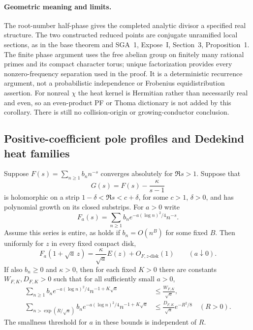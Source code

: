 \paragraph{Geometric meaning and limits.}
The root-number half-phase gives the completed analytic divisor a
specified real structure. The two constructed reduced points are
conjugate unramified local sections, as in the base theorem and
SGA~1, Expose~I, Section~3, Proposition~1. The finite phase argument
uses the free abelian group on finitely many rational primes and
its compact character torus; unique factorization provides every
nonzero-frequency separation used in the proof. It is a
deterministic recurrence argument, not a probabilistic independence
or Frobenius equidistribution assertion. For nonreal \(\chi\) the
heat kernel is Hermitian rather than necessarily real and even,
so an even-product PF or Thoma dictionary is not added by this
corollary. There is still no collision-origin or growing-conductor
conclusion.


\subsection{Positive-coefficient pole profiles and Dedekind heat families}

\begin{lemma}
\label{lem:A051-generalpole}
Suppose \(F(s)=\sum_{n\ge1}b_nn^{-s}\) converges absolutely for
\(\Re s>1\). Suppose that
\[
                  G(s)=F(s)-\frac\kappa{s-1}
\]
is holomorphic on a strip \(1-\delta<\Re s<c+\delta\), for some
\(c>1\), \(\delta>0\), and has polynomial growth on its closed
substrips. For \(a>0\) write
\[
                  F_a(s)=\sum_{n\ge1}
                      b_ne^{-a(\log n)^2/4}n^{-s}.
\]
Assume this series is entire, as holds if \(b_n=O(n^B)\) for some
fixed \(B\). Then uniformly for \(z\) in every fixed compact disk,
\begin{equation}\label{eq:A051-generalpole}
           F_a(1+\sqrt a\,z)
                =\frac\kappa{\sqrt a}E(z)+O_{F,z\text{-disk}}(1)
                           \qquad(a\downarrow0).
\end{equation}
If also \(b_n\ge0\) and \(\kappa>0\), then for each fixed \(K>0\)
there are constants \(W_{F,K},D_{F,K}>0\) such that for all
sufficiently small \(a>0\),
\begin{align}
 \sum_{n\ge1}b_ne^{-a(\log n)^2/4}n^{-1+K\sqrt a}
                     &\le\frac{W_{F,K}}{\sqrt a},
                          \label{eq:A051-general-mass}\\
 \sum_{n>\exp(R/\sqrt a)}b_ne^{-a(\log n)^2/4}n^{-1+K\sqrt a}
                     &\le\frac{D_{F,K}}{\sqrt a}e^{-R^2/8}
                    \quad(R>0).\label{eq:A051-general-tail}
\end{align}
The smallness threshold for \(a\) in these bounds is independent
of \(R\).
\end{lemma}

